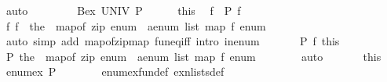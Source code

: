 \begin{isabellebody}
\ auto\isanewline
\ \ \isamarkupfalse%
\isanewline
\ \ \ \ \isamarkupfalse%
\ {\isachardoublequoteopen}Bex\ UNIV\ P{\isachardoublequoteclose}\isanewline
\ \ \ \ \isamarkupfalse%
\ this\ \isamarkupfalse%
\ f\ \ {\isachardoublequoteopen}P\ f{\isachardoublequoteclose}\ \isacommand{{\isachardot}{\kern0pt}{\isachardot}{\kern0pt}}\isamarkupfalse%
\isanewline
\ \ \ \ \isamarkupfalse%
\ f{\isacharcolon}{\kern0pt}\ {\isachardoublequoteopen}f\ {\isacharequal}{\kern0pt}\ the\ {\isasymcirc}\ map{\isacharunderscore}{\kern0pt}of\ {\isacharparenleft}{\kern0pt}zip\ {\isacharparenleft}{\kern0pt}enum\ {\isacharcolon}{\kern0pt}{\isacharcolon}{\kern0pt}\ {\isacharprime}{\kern0pt}a{\isacharcolon}{\kern0pt}{\isacharcolon}{\kern0pt}enum\ list{\isacharparenright}{\kern0pt}\ {\isacharparenleft}{\kern0pt}map\ f\ enum{\isacharparenright}{\kern0pt}{\isacharparenright}{\kern0pt}{\isachardoublequoteclose}\isanewline
\ \ \ \ \ \ \isamarkupfalse%
\ {\isacharparenleft}{\kern0pt}auto\ simp\ add{\isacharcolon}{\kern0pt}\ map{\isacharunderscore}{\kern0pt}of{\isacharunderscore}{\kern0pt}zip{\isacharunderscore}{\kern0pt}map\ fun{\isacharunderscore}{\kern0pt}eq{\isacharunderscore}{\kern0pt}iff\ intro{\isacharcolon}{\kern0pt}\ in{\isacharunderscore}{\kern0pt}enum{\isacharparenright}{\kern0pt}\ \isanewline
\ \ \ \ \isamarkupfalse%
\ {\isacartoucheopen}P\ f{\isacartoucheclose}\ this\ \isamarkupfalse%
\ {\isachardoublequoteopen}P\ {\isacharparenleft}{\kern0pt}the\ {\isasymcirc}\ map{\isacharunderscore}{\kern0pt}of\ {\isacharparenleft}{\kern0pt}zip\ {\isacharparenleft}{\kern0pt}enum\ {\isacharcolon}{\kern0pt}{\isacharcolon}{\kern0pt}\ {\isacharprime}{\kern0pt}a{\isacharcolon}{\kern0pt}{\isacharcolon}{\kern0pt}enum\ list{\isacharparenright}{\kern0pt}\ {\isacharparenleft}{\kern0pt}map\ f\ enum{\isacharparenright}{\kern0pt}{\isacharparenright}{\kern0pt}{\isacharparenright}{\kern0pt}{\isachardoublequoteclose}\isanewline
\ \ \ \ \ \ \isamarkupfalse%
\ auto\isanewline
\ \ \ \ \isamarkupfalse%
\ \ this\ \isamarkupfalse%
\ {\isachardoublequoteopen}enum{\isacharunderscore}{\kern0pt}ex\ P{\isachardoublequoteclose}\isanewline
\ \ \ \ \ \ \isamarkupfalse%
\ enum{\isacharunderscore}{\kern0pt}ex{\isacharunderscore}{\kern0pt}fun{\isacharunderscore}{\kern0pt}def\ ex{\isacharunderscore}{\kern0pt}n{\isacharunderscore}{\kern0pt}lists{\isacharunderscore}{\kern0pt}def\isanewline
\ \ \ \ \ \ \isamarkupfalse%

\end{isabellebody}
